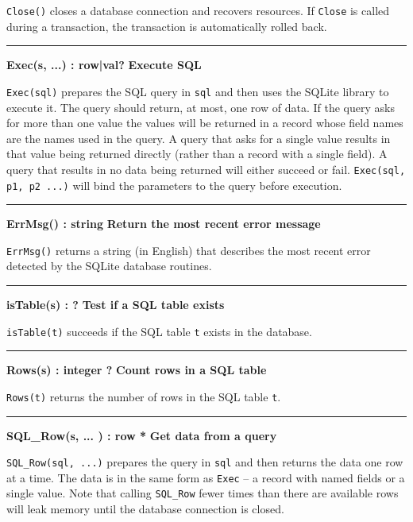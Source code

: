 \noindent
\texttt{Close()} closes a database connection and recovers resources. If
\texttt{Close} is called during a transaction, the transaction is automatically
rolled back.

\bigskip\hrule\vspace{0.1cm}
\noindent
{\bf Exec(s, ...) : row|val? } \hfill {\bf Execute SQL}

\noindent
\texttt{Exec(sql)} prepares the SQL query in \texttt{sql} and then uses the
SQLite library to execute it. The query should return, at most, one row of data.
If the query asks for more than one value the values will be returned in a
record whose field names are the names used in the query. A query that asks for a
single value results in that value being returned directly (rather than a record
with a single field). A query that results in no data being returned will either
succeed or fail.  \texttt{Exec(sql, p1, p2 ...)}  will bind the parameters to
the query before execution.

\bigskip\hrule\vspace{0.1cm}
\noindent
{\bf ErrMsg() : string } \hfill {\bf Return the most recent error message}

\noindent
\texttt{ErrMsg()} returns a string (in English) that describes the most recent
error detected by the SQLite database routines.

\bigskip\hrule\vspace{0.1cm}
\noindent
{\bf isTable(s) :  ? } \hfill {\bf Test if a SQL table exists}
    
\noindent
\texttt{isTable(t)} succeeds if the SQL table \texttt{t} exists in the database.

\bigskip\hrule\vspace{0.1cm}
\noindent
{\bf Rows(s) : integer ? } \hfill {\bf Count rows in a SQL table}
    
\noindent
\texttt{Rows(t)} returns the number of rows in the SQL table \texttt{t}.

\bigskip\hrule\vspace{0.1cm}
\noindent
{\bf SQL\_Row(s, ... ) : row * } \hfill {\bf Get data from a query}

\noindent
\texttt{SQL\_Row(sql, ...)} prepares the query in \texttt{sql} and then returns
the data one row at a time. The data is in the same form as \texttt{Exec} -- a
record with named fields or a single value.  Note that calling \texttt{SQL\_Row}
fewer times than there are available rows will leak memory until the database
connection is closed.

